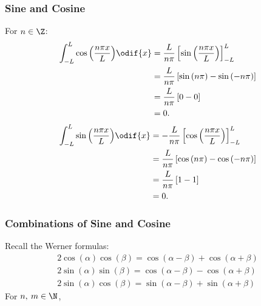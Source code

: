 \documentclass{article}
\begin{document}
\subsubsection{Sine and Cosine}
For \(n \in \Z\):
\begin{align*}
    \int_{-L}^L \cos{\left( \frac{n \pi x}{L} \right)} \odif{x} & = \frac{L}{n \pi} \left[ \sin{\left( \frac{n \pi x}{L} \right)} \right]_{-L}^L            \\
                                                                & = \frac{L}{n \pi} \left[ \sin{\left( n \pi \right)} - \sin{\left( -n \pi \right)} \right] \\
                                                                & = \frac{L}{n \pi} \left[ 0 - 0 \right]                                                    \\
                                                                & = 0.
\end{align*}
\begin{align*}
    \int_{-L}^L \sin{\left( \frac{n \pi x}{L} \right)} \odif{x} & = -\frac{L}{n \pi} \left[ \cos{\left( \frac{n \pi x}{L} \right)} \right]_{-L}^L           \\
                                                                & = \frac{L}{n \pi} \left[ \cos{\left( n \pi \right)} - \cos{\left( -n \pi \right)} \right] \\
                                                                & = \frac{L}{n \pi} \left[ 1 - 1 \right]                                                    \\
                                                                & = 0.
\end{align*}
\subsubsection{Combinations of Sine and Cosine}
Recall the Werner formulas:
\begin{gather*}
    2 \cos{\left( \alpha \right)} \cos{\left( \beta \right)} = \cos{\left( \alpha - \beta \right)} + \cos{\left( \alpha + \beta \right)} \\
    2 \sin{\left( \alpha \right)} \sin{\left( \beta \right)} = \cos{\left( \alpha - \beta \right)} - \cos{\left( \alpha + \beta \right)} \\
    2 \sin{\left( \alpha \right)} \cos{\left( \beta \right)} = \sin{\left( \alpha - \beta \right)} + \sin{\left( \alpha + \beta \right)}
\end{gather*}
For \(n,\: m \in \N\),
\end{document}
